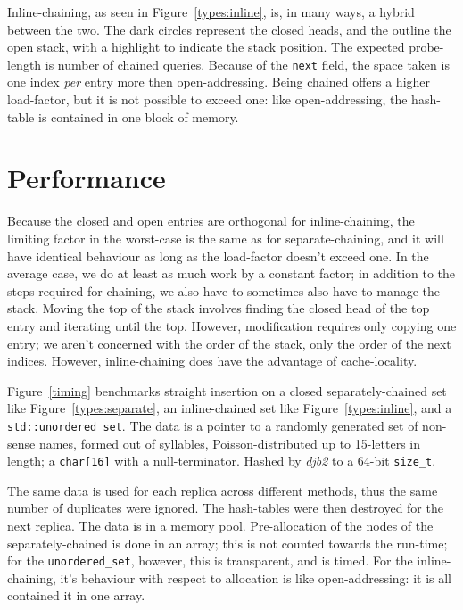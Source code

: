 \documentclass[12pt]{article}
\newcommand{\code}[1]{\colorbox{light-gray}{\texttt{#1}}}
\begin{document}
Inline-chaining, as seen in Figure~\ref{types:inline}, is, in many ways, a hybrid between the two. The dark circles represent the closed heads, and the outline the open stack, with a highlight to indicate the stack position. The expected probe-length is number of chained queries. Because of the \code{next} field, the space taken is one index {\it per} entry more then open-addressing. Being chained offers a higher load-factor, but it is not possible to exceed one: like open-addressing, the hash-table is contained in one block of memory.

\section{Performance}

Because the closed and open entries are orthogonal for inline-chaining, the limiting factor in the worst-case is the same as for separate-chaining, and it will have identical behaviour as long as the load-factor doesn't exceed one. In the average case, we do at least as much work by a constant factor; in addition to the steps required for chaining, we also have to sometimes also have to manage the stack. Moving the top of the stack involves finding the closed head of the top entry and iterating until the top. However, modification requires only copying one entry; we aren't concerned with the order of the stack, only the order of the next indices. However, inline-chaining does have the advantage of cache-locality.

Figure~\ref{timing} benchmarks straight insertion on a closed separately-chained set like Figure~\ref{types:separate}, an inline-chained set like Figure~\ref{types:inline}, and a \code{std::unordered\_set}. The data is a pointer to a randomly generated set of non-sense names, formed out of syllables, Poisson-distributed up to 15-letters in length; a \code{char[16]} with a null-terminator. Hashed by {\it djb2} to a 64-bit \code{size\_t}.

The same data is used for each replica across different methods, thus the same number of duplicates were ignored. The hash-tables were then destroyed for the next replica. The data is in a memory pool. Pre-allocation of the nodes of the separately-chained is done in an array; this is not counted towards the run-time; for the \code{unordered\_set}, however, this is transparent, and is timed. For the inline-chaining, it's behaviour with respect to allocation is like open-addressing: it is all contained it in one array.
\end{document}

